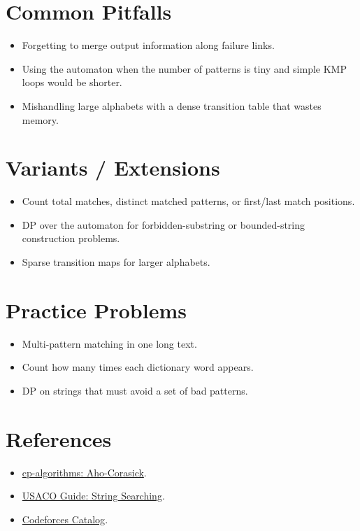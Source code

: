 \section*{Common Pitfalls}

\begin{itemize}
  \item Forgetting to merge output information along failure links.
  \item Using the automaton when the number of patterns is tiny and simple KMP loops would be shorter.
  \item Mishandling large alphabets with a dense transition table that wastes memory.
\end{itemize}

\section*{Variants / Extensions}

\begin{itemize}
  \item Count total matches, distinct matched patterns, or first/last match positions.
  \item DP over the automaton for forbidden-substring or bounded-string construction problems.
  \item Sparse transition maps for larger alphabets.
\end{itemize}

\section*{Practice Problems}

\begin{itemize}
  \item Multi-pattern matching in one long text.
  \item Count how many times each dictionary word appears.
  \item DP on strings that must avoid a set of bad patterns.
\end{itemize}

\section*{References}

\begin{itemize}
  \item \href{https://cp-algorithms.com/string/aho_corasick.html}{cp-algorithms: Aho-Corasick}.
  \item \href{https://usaco.guide/adv/string-search}{USACO Guide: String Searching}.
  \item \href{https://codeforces.com/catalog?locale=en}{Codeforces Catalog}.
\end{itemize}
